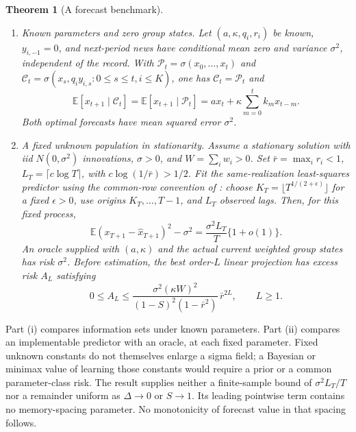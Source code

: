 \documentclass[12pt]{article}
\newtheorem{theorem}{Theorem}[section]
\theoremstyle{definition}
\theoremstyle{remark}
\begin{document}
\begin{theorem}[A forecast benchmark]\label{n:irr}
\begin{enumerate}[label=(\roman*),itemsep=1pt]
\item \emph{Known parameters and zero group states.} Let $(a,\kappa,q_i,r_i)$ be known, $y_{i,-1}=0$, and next-period news have conditional mean zero and variance $\sigma^2$, independent of the record. With $\mathcal P_t=\sigma(x_0,\ldots,x_t)$ and $\mathcal C_t=\sigma(x_s,q_i y_{i,s}:0\le s\le t, i\le K)$, one has $\mathcal C_t=\mathcal P_t$ and
\[
\mathbb E[x_{t+1}\mid\mathcal C_t]=\mathbb E[x_{t+1}\mid\mathcal P_t]
=a x_t+\kappa\sum_{m=0}^t k_m x_{t-m}.
\]
Both optimal forecasts have mean squared error $\sigma^2$.
\item \emph{A fixed unknown population in stationarity.} Assume a stationary solution with iid $N(0,\sigma^2)$ innovations, $\sigma>0$, and $W=\sum_iw_i>0$. Set $\bar r=\max_i r_i<1$, $L_T=\lceil c\log T\rceil$, with $c\log(1/\bar r)>1/2$. Fit the same-realization least-squares predictor using the common-row convention of \citet[Proposition~2]{ingwei2005}: choose $K_T=\lfloor T^{1/(2+\epsilon)}\rfloor$ for a fixed $\epsilon>0$, use origins $K_T,\ldots,T-1$, and $L_T$ observed lags. Then, for this fixed process,
\[
\mathbb E(x_{T+1}-\hat x_{T+1})^2-\sigma^2
=\frac{\sigma^2 L_T}{T}\{1+o(1)\}.
\]
An oracle supplied with $(a,\kappa)$ and the actual current weighted group states has risk $\sigma^2$. Before estimation, the best order-$L$ linear projection has excess risk $A_L$ satisfying
\[
0\le A_L\le
\frac{\sigma^2(\kappa W)^2}{(1-S)^2(1-\bar r^2)}\,\bar r^{2L},\qquad L\ge1.
\]
\end{enumerate}
\end{theorem}

Part (i) compares information sets under known parameters. Part (ii) compares an implementable predictor with an oracle, at each fixed parameter. Fixed unknown constants do not themselves enlarge a sigma field; a Bayesian or minimax value of learning those constants would require a prior or a common parameter-class risk. The result supplies neither a finite-sample bound of $\sigma^2L_T/T$ nor a remainder uniform as $\Delta\to0$ or $S\to1$. Its leading pointwise term contains no memory-spacing parameter. No monotonicity of forecast value in that spacing follows.
\end{document}
